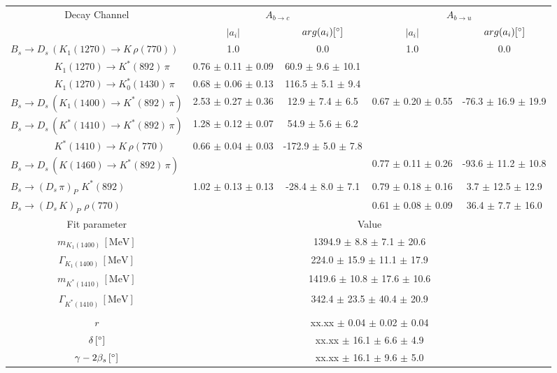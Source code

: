\begin{tabular}{l c c c c } 
\hline
\hline
\multicolumn{1}{c}{Decay Channel} & \multicolumn{2}{c}{$A_{b \to c}$} & \multicolumn{2}{c}{$A_{b \to u}$}  \\ 
 & \multicolumn{1}{c}{$\vert a_i \vert$}  & \multicolumn{1}{c}{$arg(a_i) [^{\circ}]$}  & \multicolumn{1}{c}{$\vert a_i \vert$} & \multicolumn{1}{c}{$arg(a_i) [^{\circ}]$} \\ 
\hline
 $B_s \to D_s \, ( K_1(1270) \to K \, \rho(770) ) $ &  1.0 & 0.0 & 1.0 & 0.0  \\ 
$\phantom{B_s \to D_s \, (} K_1(1270) \to K^{*}(892) \, \pi \phantom{)} $ & 0.76 $\pm$ 0.11 $\pm$ 0.09 & 60.9 $\pm$ 9.6 $\pm$ 10.1 & &   \\ 
$\phantom{B_s \to D_s \, (} K_1(1270) \to K^{*}_{0}(1430) \, \pi \phantom{)} $ & 0.68 $\pm$ 0.06 $\pm$ 0.13 & 116.5 $\pm$ 5.1 $\pm$ 9.4 & &   \\ 
$B_s \to D_s \, ( K_1(1400) \to K^{*}(892) \, \pi ) $ & 2.53 $\pm$ 0.27 $\pm$ 0.36 & 12.9 $\pm$ 7.4 $\pm$ 6.5 & 0.67 $\pm$ 0.20 $\pm$ 0.55 & -76.3 $\pm$ 16.9 $\pm$ 19.9 \\ 
$B_s \to D_s \, ( K^{*}(1410) \to K^{*}(892) \, \pi ) $ & 1.28 $\pm$ 0.12 $\pm$ 0.07 & 54.9 $\pm$ 5.6 $\pm$ 6.2 &  &  \\ 
$\phantom{B_s \to D_s \, (} K^{*}(1410) \to K \, \rho(770) \phantom{)} $ & 0.66 $\pm$ 0.04 $\pm$ 0.03 & -172.9 $\pm$ 5.0 $\pm$ 7.8 & &   \\ 
$B_s \to D_s \, ( K(1460) \to K^{*}(892) \, \pi ) $ & & &0.77 $\pm$ 0.11 $\pm$ 0.26 & -93.6 $\pm$ 11.2 $\pm$ 10.8 \\ 
$B_s \to ( D_s \, \pi)_{P} \, \, K^{*}(892) $ & 1.02 $\pm$ 0.13 $\pm$ 0.13 & -28.4 $\pm$ 8.0 $\pm$ 7.1 & 0.79 $\pm$ 0.18 $\pm$ 0.16 & 3.7 $\pm$ 12.5 $\pm$ 12.9 \\ 
$B_s \to ( D_s \, K)_{P} \, \, \rho(770) $ & & &0.61 $\pm$ 0.08 $\pm$ 0.09 & 36.4 $\pm$ 7.7 $\pm$ 16.0 \\ 
\hline
\hline
\multicolumn{1}{c}{Fit parameter} & \multicolumn{4}{c}{Value}  \\ 
\hline
\multicolumn{1}{c}{$m_{K_1(1400)} \, [\text{MeV}]$} & \multicolumn{4}{c}{1394.9 $\pm$ 8.8 $\pm$ 7.1 $\pm$ 20.6} \\ 
\multicolumn{1}{c}{$\Gamma_{K_1(1400)} \, [\text{MeV}]$} & \multicolumn{4}{c}{224.0 $\pm$ 15.9 $\pm$ 11.1 $\pm$ 17.9} \\ 
\multicolumn{1}{c}{$m_{K^{*}(1410)} \, [\text{MeV}]$} & \multicolumn{4}{c}{1419.6 $\pm$ 10.8 $\pm$ 17.6 $\pm$ 10.6} \\ 
\multicolumn{1}{c}{$\Gamma_{K^{*}(1410)} \, [\text{MeV}]$} & \multicolumn{4}{c}{342.4 $\pm$ 23.5 $\pm$ 40.4 $\pm$ 20.9} \\ 
 \\ 
\multicolumn{1}{c}{$r$} & \multicolumn{4}{c}{xx.xx $\pm$ 0.04 $\pm$ 0.02 $\pm$ 0.04} \\ 
\multicolumn{1}{c}{$\delta \, [^{\circ}]$} & \multicolumn{4}{c}{xx.xx $\pm$ 16.1 $\pm$ 6.6 $\pm$ 4.9} \\ 
\multicolumn{1}{c}{$\gamma - 2 \beta_{s} \, [^{\circ}]$} & \multicolumn{4}{c}{xx.xx $\pm$ 16.1 $\pm$ 9.6 $\pm$ 5.0} \\ 
\hline
\hline
\end{tabular}
